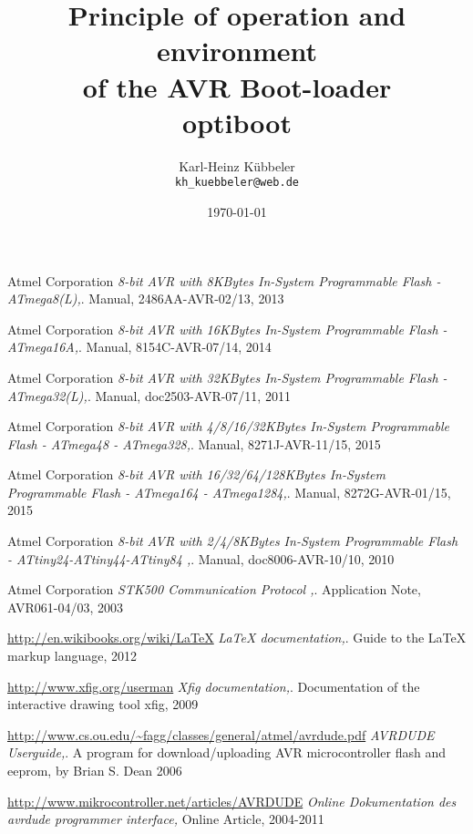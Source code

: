\documentclass[pdftex,12pt,a4paper,oneside,english]{report}
\begin{document}
\title{Principle of operation and environment\\
of the AVR Boot-loader \\
 optiboot\\
}
\author{Karl-Heinz Kübbeler\\
\texttt{kh\_kuebbeler@web.de}}
\date{\today}

\maketitle
\tableofcontents










\begin{thebibliography}{99}

Atmel Corporation
\emph{8-bit AVR with 8KBytes In-System Programmable Flash - ATmega8(L),}.
Manual,
2486AA-AVR-02/13,
2013

Atmel Corporation
\emph{8-bit AVR with 16KBytes In-System Programmable Flash - ATmega16A,}.
Manual,
8154C-AVR-07/14,
2014

Atmel Corporation
\emph{8-bit AVR with 32KBytes In-System Programmable Flash - ATmega32(L),}.
Manual,
doc2503-AVR-07/11,
2011

Atmel Corporation
\emph{8-bit AVR with 4/8/16/32KBytes In-System Programmable Flash - ATmega48 - ATmega328,}.
Manual,
8271J-AVR-11/15,
2015

Atmel Corporation
\emph{8-bit AVR with 16/32/64/128KBytes In-System Programmable Flash - ATmega164 - ATmega1284,}.
Manual,
8272G-AVR-01/15,
2015

Atmel Corporation
\emph{8-bit AVR with 2/4/8KBytes In-System Programmable Flash - ATtiny24-ATtiny44-ATtiny84 ,}.
Manual,
doc8006-AVR-10/10,
2010

Atmel Corporation
\emph{STK500 Communication Protocol ,}.
Application Note,
AVR061-04/03,
2003

\url{http://en.wikibooks.org/wiki/LaTeX}
\emph{LaTeX documentation,}.
Guide to the LaTeX markup language,
2012

\url{http://www.xfig.org/userman}
\emph{Xfig documentation,}.
Documentation of the interactive drawing tool xfig,
2009

\url{http://www.cs.ou.edu/~fagg/classes/general/atmel/avrdude.pdf}
\emph{AVRDUDE Userguide,}.
A program for download/uploading AVR microcontroller flash and eeprom,
by Brian S. Dean
2006

\url{http://www.mikrocontroller.net/articles/AVRDUDE}
\emph{Online Dokumentation des avrdude programmer interface,}
Online Article,
2004-2011



\end{thebibliography}
\end{document}

